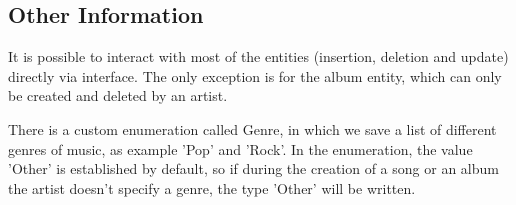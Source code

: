 \subsection{Other Information}


It is possible to interact with most of the entities (insertion, deletion and update) directly via interface. The only exception is for the album entity, which can only be created and deleted by an artist.  

There is a custom enumeration called Genre, in which we save a list of different genres of music, as example 'Pop' and 'Rock'. In the enumeration, the value 'Other' is established by default, so if during the creation of a song or an album the artist doesn't specify a genre, the type 'Other' will be written.
